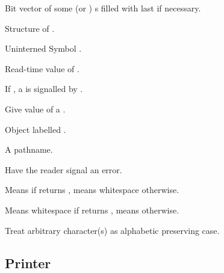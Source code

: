 \begin{LIST}{1cm}
  {
  \index{\#\A}%
  Bit vector of some (or )
  s filled with last  if necessary.
  }

  {
  Structure of .
  }

  {
  Uninterned Symbol .
  }

  {
  Read-time value of .
  }

  {
  If \NIL, a  is signalled by .
  }

  {
  \index{\#=}%
  Give value of  a .
  }

  {
  \index{\#\#}%
  Object labelled .
  }

  {
  A pathname.
  }

  \IT{\KWD{\#\boldmath$<$}}
  {
  Have the reader signal an error.
  }

  {
  Means  if  returns \T, means whitespace
  otherwise. 
  }

  {
  Means whitespace if  returns \T, means  
  otherwise. 
  }

  {
    Treat arbitrary character(s)  as alphabetic preserving case.
  }
    \index{\@{$\backslash$}}%

\end{LIST}


\subsection{Printer} 


